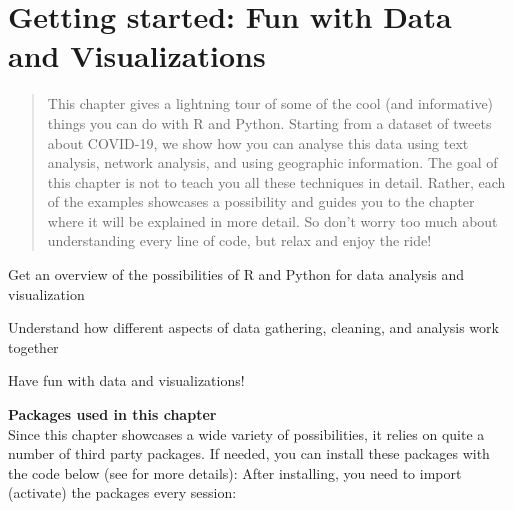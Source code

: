 \chapter{Getting started: Fun with Data and Visualizations}
\label{chap:fundata}

\begin{abstract}
  This chapter gives a lightning tour of some of the cool (and informative) things you can do with R and Python.
  Starting from a dataset of tweets about COVID-19, we show how you can analyse this data using
  text analysis, network analysis, and using geographic information.
  The goal of this chapter is not to teach you all these techniques in detail.
  Rather, each of the examples showcases a possibility and guides you to the chapter where it will be explained in more detail.
  So don't worry too much about understanding every line of code, but relax and enjoy the ride!
\end{abstract}


\begin{objectives}
\item Get an overview of the possibilities of R and Python for data analysis and visualization
\item Understand how different aspects of data gathering, cleaning, and analysis work together
\item Have fun with data and visualizations!
\end{objectives}

\newpage
\begin{feature}
  \textbf{Packages used in this chapter}\\
  Since this chapter showcases a wide variety of possibilities,
  it relies on quite a number of third party packages.
  If needed, you can install these packages with the code below
  (see  for more details):
  \noindent After installing, you need to import (activate) the packages every session:
\end{feature}




